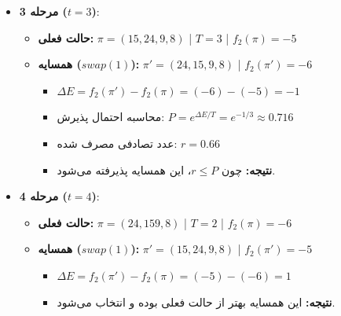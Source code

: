 \begin{ابجد}
\begin{itemize}
    \item \textbf{مرحله 3 ($t=3$)}:
          \begin{itemize}
              \item \textbf{حالت فعلی:} $\pi = (15, 24, 9, 8)$ | $T = 3$ | $f_2(\pi) = -5$
              \item \textbf{همسایه ($swap(1)$):} $\pi' = (24, 15, 9, 8)$ | $f_2(\pi') = -6$
                    \begin{itemize}
                        \item $\Delta E = f_2(\pi') - f_2(\pi) = (-6) - (-5) = -1$
                        \item محاسبه احتمال پذیرش: $P = e^{\Delta E / T} = e^{-1/3} \approx 0.716$
                        \item عدد تصادفی مصرف شده: $r = 0.66$
                        \item \textbf{نتیجه:} چون $r \le P$، این همسایه پذیرفته می‌شود.
                    \end{itemize}
          \end{itemize}

          \vspace{0.7cm}

    \item \textbf{مرحله 4 ($t=4$)}:
          \begin{itemize}
              \item \textbf{حالت فعلی:} $\pi = (24, 15 9, 8)$ | $T = 2$ | $f_2(\pi) = -6$
              \item \textbf{همسایه ($swap(1)$):} $\pi' = (15, 24, 9, 8)$ | $f_2(\pi') = -5$
                    \begin{itemize}
                        \item $\Delta E = f_2(\pi') - f_2(\pi) = (-5) - (-6) = 1$
                        \item \textbf{نتیجه:} این همسایه بهتر از حالت فعلی بوده و انتخاب می‌شود.
                    \end{itemize}
          \end{itemize}

          \vspace{0.7cm}


\end{itemize}
\end{ابجد}
